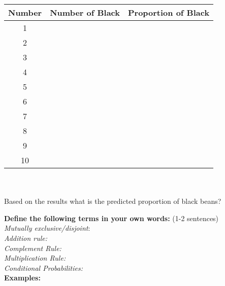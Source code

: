 \documentclass[12pt]{article}
\begin{document}
\begin{tabular}{| c | c | r |}
 \hline 
Number & Number of Black & Proportion of Black \\  \hline 
1 &  & \\  [12pt] \hline 
2 & & \\  [12pt] \hline 
3 & & \\  [12pt] \hline 
4 & & \\  [12pt]  \hline 
5 & & \\  [12pt] \hline 
6 & & \\  [12pt] \hline 
7 & & \\  [12pt] \hline 
8 & & \\  [12pt] \hline 
9 & & \\  [12pt] \hline 
10 & & \\  [12pt] \hline 
\end{tabular}
\\
\\
Based on the results what is the predicted proportion of black beans? \\


 
 \clearpage
 
\textbf{Define the following terms in your own words:} (1-2 sentences) \\

\textit{Mutually exclusive/disjoint}: \\[12pt] 
\textit{Addition rule:} \\ [12pt] 
\textit{Complement Rule:} \\ [12pt] 
\textit{Multiplication Rule:} \\ [12pt] 
\textit{Conditional Probabilities:}  \\ [12pt] 

\textbf{Examples:}\\
\end{document}
